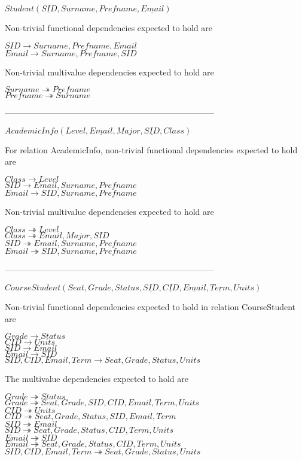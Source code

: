 $Student(\underline{SID}, Surname, Prefname, \underline{Email})$

Non-trivial functional dependencies expected to hold are

$SID \rightarrow Surname, Prefname, Email$\\
$Email \rightarrow Surname,Prefname,SID$

Non-trivial multivalue dependencies expected to hold are

$Surname \twoheadrightarrow Prefname$\\
$Prefname \twoheadrightarrow Surname$

---------------------------------------------------------------------------

$AcademicInfo(Level, \underline{Email}, Major, \underline{SID}, Class)$

For relation AcademicInfo, non-trivial functional dependencies expected to hold are

$Class \rightarrow Level$\\
$SID \rightarrow Email,Surname,Prefname$\\
$Email \rightarrow SID,Surname,Prefname$

Non-trivial multivalue dependencies expected to hold are

$Class \twoheadrightarrow Level$\\
$Class \twoheadrightarrow Email, Major, SID$\\
$SID \twoheadrightarrow Email,Surname,Prefname$\\
$Email \twoheadrightarrow SID,Surname,Prefname$

---------------------------------------------------------------------------

$CourseStudent(Seat, Grade, Status, \underline{SID}, \underline{CID}, \underline{Email}, \underline{Term}, Units)$

Non-trivial functional dependencies expected to hold in  relation CourseStudent are

$Grade \rightarrow Status$\\
$CID \rightarrow Units$\\
$SID \rightarrow Email$\\
$Email \rightarrow SID$\\
$SID,CID,Email,Term \rightarrow Seat,Grade,Status,Units$


The multivalue dependencies expected to hold are

$Grade \twoheadrightarrow Status$\\
$Grade \twoheadrightarrow Seat, Grade, SID, CID, Email, Term, Units$\\
$CID \twoheadrightarrow Units$\\
$CID \twoheadrightarrow Seat, Grade, Status, SID, Email, Term$\\
$SID \twoheadrightarrow Email$\\
$SID \twoheadrightarrow Seat, Grade, Status, CID, Term, Units$\\
$Email \twoheadrightarrow SID$\\
$Email \twoheadrightarrow Seat, Grade, Status, CID, Term, Units$\\
$SID,CID,Email,Term \twoheadrightarrow Seat,Grade,Status,Units$

